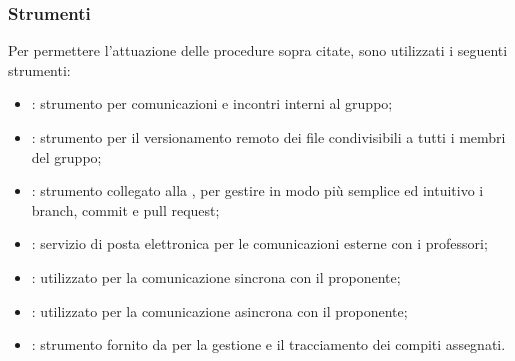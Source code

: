  	\subsubsection{Strumenti}
 	Per permettere l'attuazione delle procedure sopra citate, sono utilizzati i seguenti strumenti:
 	\begin{itemize}
 		\item \textbf{}: strumento per comunicazioni e incontri interni al gruppo;
 		\item \textbf{}: strumento per il versionamento remoto dei file condivisibili a tutti i membri del gruppo;
 		\item \textbf{}: strumento collegato alla  , per gestire in modo più semplice ed intuitivo i branch, commit e pull request;
 		\item \textbf{}: servizio di posta elettronica per le comunicazioni esterne con i professori;
        \item \textbf{}: utilizzato per la comunicazione sincrona con il proponente;
        \item \textbf{}: utilizzato per la comunicazione asincrona con il proponente;
 		\item {\bfseries {}}: strumento fornito da  per la gestione e il tracciamento dei compiti assegnati.
 	\end{itemize}
